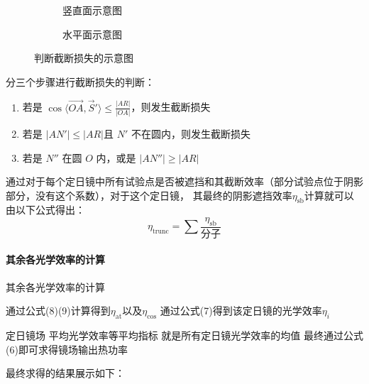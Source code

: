 \documentclass[../main.tex]{subfiles}
\begin{document}
\begin{figure}[H]
\centering
\begin{subfigure}[b]{0.4\textwidth}
\centering

\caption{竖直面示意图}
\end{subfigure}
\begin{subfigure}[b]{0.4\textwidth}
\centering

\caption{水平面示意图}
\end{subfigure}
\caption{判断截断损失的示意图}
\end{figure}

分三个步骤进行截断损失的判断：
\begin{enumerate}
\item 若是 \( \displaystyle\cos \langle \overrightarrow{OA}, \vec S' \rangle\le \frac{\vert AR \vert}{\vert OA \vert}\)，则发生截断损失
\item 若是 \(\vert AN'\vert \le \vert AR \vert\)且 \(N'\) 不在圆内，则发生截断损失
\item 若是 \(N''\) 在圆 \(O\) 内，或是 \(\vert AN'' \vert \ge \vert AR \vert\)
\end{enumerate}
通过对于每个定日镜中所有试验点是否被遮挡和其截断效率（部分试验点位于阴影部分，没有这个系数），对于这个定日镜，
其最终的阴影遮挡效率\(\eta _{\mathrm{s b}}\)计算就可以由以下公式得出：
\begin{equation}
\eta _{\mathrm{trunc}} = \sum \frac{\eta _{\mathrm{s b}}}{分子}
\end{equation}

\paragraph{其余各光学效率的计算}
其余各光学效率的计算

通过公式(8)(9)计算得到\(\eta _{\mathrm{at}}\)以及\(\eta _{\cos}\)
通过公式(7)得到该定日镜的光学效率\(\eta_{i}\)

定日镜场 平均光学效率等平均指标 就是所有定日镜光学效率的均值
最终通过公式(6)即可求得镜场输出热功率

最终求得的结果展示如下：

\end{document}
